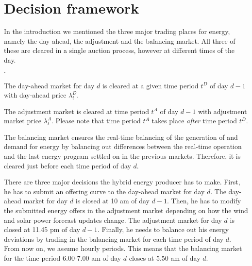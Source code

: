 \section{Decision framework}
In the introduction we mentioned the three major trading places for energy, namely the day-ahead, the adjustment and the balancing market. All three of these are cleared in a single auction process, however at different times of the day. 

\begin{list}{$\cdot$}{}
	\item The day-ahead market for day $d$ is cleared at a given time period $t^D$ of day $d-1$ with day-ahead price $\lambda_t^D$.
	\item The adjustment market is cleared at time period $t^{A}$ of day $d-1$ with adjustment market price $\lambda_t^A$. Please note that time period $t^{A}$ takes place \textit{after} time period $t^{D}$.
	\item The balancing market ensures the real-time balancing of the generation of and demand for energy by balancing out differences between the real-time operation and the last energy program settled on in the previous markets. Therefore, it is cleared just before each time period of day $d$. 
\end{list}
There are three major decisions the hybrid energy producer has to make. First, he has to submit an offering curve to the day-ahead market for day $d$. The day-ahead market for day $d$  is closed at 10 am of day $d-1$. Then, he has to modify the submitted energy offers in the adjustment market depending on how the wind and solar power forecast updates change. The adjustment market for day $d$  is closed at 11.45 pm of day $d-1$. Finally, he needs to balance out his energy deviations by trading in the balancing market for each time period of day $d$. From now on, we assume hourly periods. This means that the balancing market for the time period 6.00-7.00 am of day $d$ closes at 5.50 am of day $d$. 
\\

